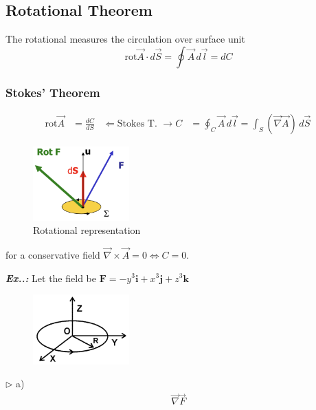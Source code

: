 \documentclass[a4paper]{article}
\begin{document}
\subsection{Rotational Theorem}
\setcounter{equation}{0}
The rotational measures the circulation over surface unit
$$
\text{rot}\vec{A}\cdot d\vec{S}=\oint\vec{A}\,d\vec{l}=dC
$$
\subsubsection{Stokes' Theorem}
\setcounter{equation}{0}
\begin{align}
\text{rot}\vec{A}&=\frac{dC}{dS} &\Leftarrow \text{Stokes T. } \to C&=\oint_{C}\vec{A}\,d\vec{l}=\int _{S}(\vec{\nabla}\vec{A}) \, d\vec{S}\, 
\end{align}

\begin{figure}[H]
    \centering
    \includegraphics[width=0.33\textwidth]{IMG/rot.png}
    \caption{Rotational representation}
    \label{fig:rot}
\end{figure}

for a conservative field $\vec{\nabla}\times\vec{A}=0 \iff C=0$.

\vspace{2ex}\textbf{\textit{Ex.\thesection.\theex: }}Let the field be $\mathbf{F}=-y^{3}\mathbf{i}+x^{3}\mathbf{j}+z^{3}\mathbf{k}$

\begin{figure}[H]
    \centering
    \includegraphics[width=0.33\textwidth]{IMG/c1_2020.png}
    \caption{}
    \label{fig:c1_2020}
\end{figure}

$\triangleright$ a)
\begin{align}
\vec{\nabla}\vec{F}
\end{align}
\end{document}

